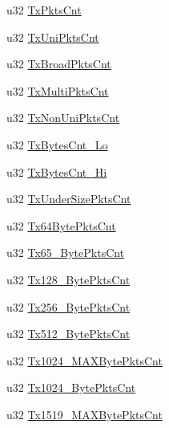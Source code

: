 \begin{DoxyCompactItemize}
\item 
u32 \hyperlink{structECNT__SWITCHMGR__PORT__STATISTICS_a4b3bbc3a3fbd1b4df1612ab6cba8d4e5}{Tx\+Pkts\+Cnt}
\item 
u32 \hyperlink{structECNT__SWITCHMGR__PORT__STATISTICS_a3c46a64406a15373012a2e21380892c2}{Tx\+Uni\+Pkts\+Cnt}
\item 
u32 \hyperlink{structECNT__SWITCHMGR__PORT__STATISTICS_a6a8adcd380cad870d231c4d22020ae4e}{Tx\+Broad\+Pkts\+Cnt}
\item 
u32 \hyperlink{structECNT__SWITCHMGR__PORT__STATISTICS_a48632fe5e07569d8aadb094973b209a8}{Tx\+Multi\+Pkts\+Cnt}
\item 
u32 \hyperlink{structECNT__SWITCHMGR__PORT__STATISTICS_a471923904b42dc87f46c3cf07bb390b6}{Tx\+Non\+Uni\+Pkts\+Cnt}
\item 
u32 \hyperlink{structECNT__SWITCHMGR__PORT__STATISTICS_a75993211bd9bc9eec597de670d7bf973}{Tx\+Bytes\+Cnt\+\_\+\+Lo}
\item 
u32 \hyperlink{structECNT__SWITCHMGR__PORT__STATISTICS_a1b7f12bc535dacb89eaec6c6a684cd5b}{Tx\+Bytes\+Cnt\+\_\+\+Hi}
\item 
u32 \hyperlink{structECNT__SWITCHMGR__PORT__STATISTICS_af85bd3367d3f268de94b63c4b6c261fe}{Tx\+Under\+Size\+Pkts\+Cnt}
\item 
u32 \hyperlink{structECNT__SWITCHMGR__PORT__STATISTICS_a8d16c0dd6502886302d0fb94ee145d81}{Tx64\+Byte\+Pkts\+Cnt}
\item 
u32 \hyperlink{structECNT__SWITCHMGR__PORT__STATISTICS_a394443d74262862da6a01109d110ce1b}{Tx65\+\_\+Byte\+Pkts\+Cnt}
\item 
u32 \hyperlink{structECNT__SWITCHMGR__PORT__STATISTICS_a69f1a89c47ab2bb603c2bb1676e8befd}{Tx128\+\_\+Byte\+Pkts\+Cnt}
\item 
u32 \hyperlink{structECNT__SWITCHMGR__PORT__STATISTICS_a5fcde9f6b82153828a4f7ce45c922c61}{Tx256\+\_\+Byte\+Pkts\+Cnt}
\item 
u32 \hyperlink{structECNT__SWITCHMGR__PORT__STATISTICS_a2496e8d5e62e89c0d00b4f9069277811}{Tx512\+\_\+Byte\+Pkts\+Cnt}
\item 
u32 \hyperlink{structECNT__SWITCHMGR__PORT__STATISTICS_a013941fffd86306c36937a9b4c72dc1a}{Tx1024\+\_\+\+M\+A\+X\+Byte\+Pkts\+Cnt}
\item 
u32 \hyperlink{structECNT__SWITCHMGR__PORT__STATISTICS_ae787a1d6e7d30f15248a0d36d113d0aa}{Tx1024\+\_\+Byte\+Pkts\+Cnt}
\item 
u32 \hyperlink{structECNT__SWITCHMGR__PORT__STATISTICS_a3145a664230e415f2ab4f103c508408a}{Tx1519\+\_\+\+M\+A\+X\+Byte\+Pkts\+Cnt}

\end{DoxyCompactItemize}
